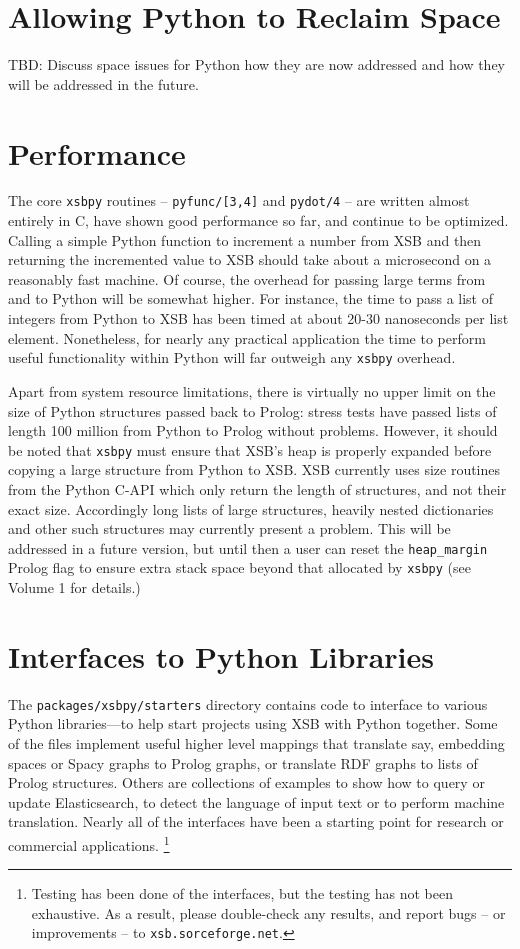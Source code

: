 \section{Allowing Python to Reclaim Space}
%
TBD: Discuss space issues for Python how they are now addressed and
how they will be addressed in the future.

\section{Performance}

The core {\tt xsbpy} routines -- {\tt pyfunc/[3,4]} and {\tt pydot/4}
-- are written almost entirely in C, have shown good performance so
far, and continue to be optimized.  Calling a simple Python function
to increment a number from XSB and then returning the incremented
value to XSB should take about a microsecond on a reasonably fast
machine.  Of course, the overhead for passing large terms from and to
Python will be somewhat higher.  For instance, the time to pass a list
of integers from Python to XSB has been timed at about 20-30
nanoseconds per list element.  Nonetheless, for nearly any practical
application the time to perform useful functionality within Python
will far outweigh any {\tt xsbpy} overhead.

Apart from system resource limitations, there is virtually no upper
limit on the size of Python structures passed back to Prolog: stress
tests have passed lists of length 100 million from Python to Prolog
without problems. However, it should be noted that {\tt xsbpy} must
ensure that XSB's heap is properly expanded before copying a large
structure from Python to XSB.  XSB currently uses size routines from
the Python C-API which only return the length of structures, and not
their exact size.  Accordingly long lists of large structures, heavily
nested dictionaries and other such structures may currently present a
problem.  This will be addressed in a future version, but until then a
user can reset the {\tt heap\_margin} Prolog flag to ensure extra
stack space beyond that allocated by {\tt xsbpy} (see Volume 1 for
details.)

\section{Interfaces to Python Libraries}

The {\tt packages/xsbpy/starters} directory contains code to interface to various
Python libraries---to help start projects using XSB with Python together.
Some of the files implement useful
higher level mappings that translate say, embedding spaces or Spacy
graphs to Prolog graphs, or translate RDF graphs to lists of Prolog
structures.  Others are collections of examples to show how to query
or update Elasticsearch, to detect the language of input text or to
perform machine translation.  Nearly all of the interfaces have been a
starting point for research or commercial
applications.  \footnote{Testing has been done of the interfaces, but
  the testing has not been exhaustive.  As a result, please
  double-check any results, and report bugs -- or improvements -- to
  {\tt xsb.sorceforge.net}.}

